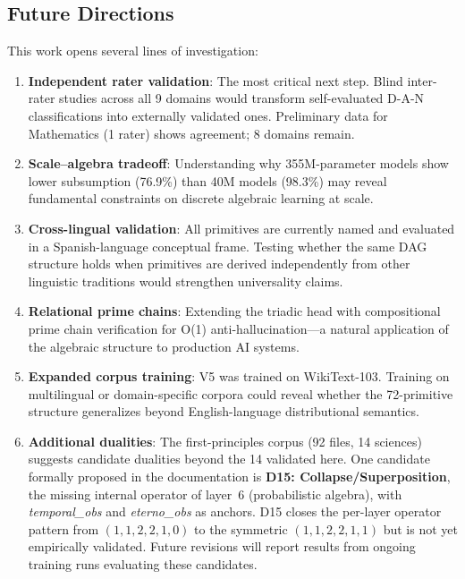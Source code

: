 \documentclass[11pt, a4paper]{article}
\begin{document}
\subsection{Future Directions}

This work opens several lines of investigation:

\begin{enumerate}[nosep, leftmargin=*]
    \item \textbf{Independent rater validation}: The most critical next step. Blind inter-rater studies across all 9 domains would transform self-evaluated D-A-N classifications into externally validated ones. Preliminary data for Mathematics (1 rater) shows agreement; 8 domains remain.
    \item \textbf{Scale--algebra tradeoff}: Understanding why 355M-parameter models show lower subsumption (76.9\%) than 40M models (98.3\%) may reveal fundamental constraints on discrete algebraic learning at scale.
    \item \textbf{Cross-lingual validation}: All primitives are currently named and evaluated in a Spanish-language conceptual frame. Testing whether the same DAG structure holds when primitives are derived independently from other linguistic traditions would strengthen universality claims.
    \item \textbf{Relational prime chains}: Extending the triadic head with compositional prime chain verification for O(1) anti-hallucination---a natural application of the algebraic structure to production AI systems.
    \item \textbf{Expanded corpus training}: V5 was trained on WikiText-103. Training on multilingual or domain-specific corpora could reveal whether the 72-primitive structure generalizes beyond English-language distributional semantics.
    \item \textbf{Additional dualities}: The first-principles corpus (92 files, 14 sciences) suggests candidate dualities beyond the 14 validated here. One candidate formally proposed in the documentation is \textbf{D15: Collapse/Superposition}, the missing internal operator of layer~6 (probabilistic algebra), with \textit{temporal\_obs} and \textit{eterno\_obs} as anchors. D15 closes the per-layer operator pattern from $(1,1,2,2,1,0)$ to the symmetric $(1,1,2,2,1,1)$ but is not yet empirically validated. Future revisions will report results from ongoing training runs evaluating these candidates.
\end{enumerate}

\end{document}
